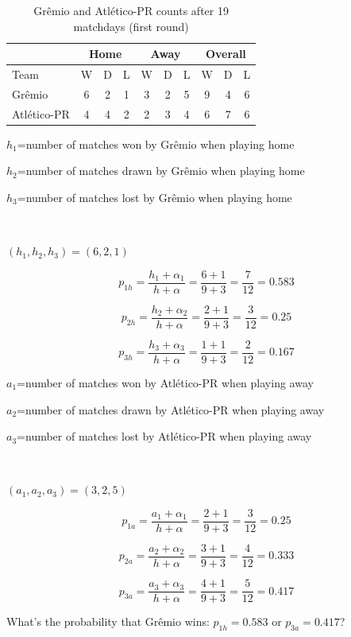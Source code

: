 \documentclass[journal,article,accept,moreauthors,pdftex,12pt,a4paper]{mdpi}
\begin{document}
\begin{table}[h]
\begin{center}
\begin{tabular}{lccccccccc}

\hline
 & \multicolumn{3}{c}{Home} & \multicolumn{3}{c}{Away}& \multicolumn{3}{c}{Overall} \\
\hline
\hline
Team & W & D & L & W & D & L & W & D & L\\
\hline
Gr\^emio & 6 & 2 & 1 & 3 & 2 & 5 & 9 & 4 & 6\\
Atl\'etico-PR & 4 & 4 & 2 & 2 & 3 & 4 & 6 & 7 & 6\\
\hline
\end{tabular}
\caption{Gr\^emio and Atl\'etico-PR counts after 19 matchdays (first round)}
\end{center}
\end{table}



$h_1$=number of matches won by Gr\^emio when playing home

$h_2$=number of matches drawn by Gr\^emio when playing home

$h_3$=number of matches lost by Gr\^emio when playing home

\

$(h_1,h_2,h_3)=(6,2,1)$


\[
p_{1h}=\frac{h_1+\alpha_1}{h+\alpha}=\frac{6+1}{9+3}=\frac{7}{12}=0.583\]

\[
p_{2h}=\frac{h_2+\alpha_2}{h+\alpha}=\frac{2+1}{9+3}=\frac{3}{12}=0.25\]

\[
p_{3h}=\frac{h_3+\alpha_3}{h+\alpha}=\frac{1+1}{9+3}=\frac{2}{12}=0.167\]


$a_1$=number of matches won by Atl\'etico-PR when playing away

$a_2$=number of matches drawn by Atl\'etico-PR when playing away

$a_3$=number of matches lost by Atl\'etico-PR when playing away

\

$(a_1,a_2,a_3)=(3,2,5)$


\[
p_{1a}=\frac{a_1+\alpha_1}{h+\alpha}=\frac{2+1}{9+3}=\frac{3}{12}=0.25\]

\[
p_{2a}=\frac{a_2+\alpha_2}{h+\alpha}=\frac{3+1}{9+3}=\frac{4}{12}=0.333\]

\[
p_{3a}=\frac{a_3+\alpha_3}{h+\alpha}=\frac{4+1}{9+3}=\frac{5}{12}=0.417\]


What's the probability that Gr\^emio wins: $p_{1h}=0.583$ or $p_{3a}=0.417$?
\end{document}
